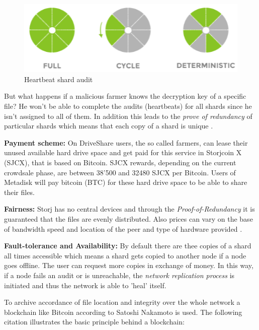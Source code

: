 	\begin{figure}[ht]
		\begin{center}
		\includegraphics[scale=0.8]{Talk5/storj_heartbeat.PNG}
		\end{center}
		\caption{Heartbeat shard audit \cite{storj:PDF}}
		\label{storj_heartbeat}
	\end{figure}

But what happens if a malicious farmer knows the decryption key of a specific file? He won't be able to complete the audits (heartbeats) for all shards since he isn't assigned to all of them. In addition this leads to the \textit{prove of redundancy} of particular shards which means that each copy of a shard is unique \cite{storj:PDF}.

\textbf{Payment scheme:} On DriveShare users, the so called farmers, can lease their unused available hard drive space and get paid for this service in Storjcoin X (SJCX), that is based on Bitcoin. SJCX rewards, depending on the current crowdsale phase, are between 38'500 and 32480 SJCX per Bitcoin\cite{storj:crowdsale}. Users of Metadisk will pay bitcoin (BTC) for these hard drive space to be able to share their files.

\textbf{Fairness:} Storj has no central devices and through the \textit{Proof-of-Redundancy} it is guaranteed that the files are evenly distributed. Also prices can vary on the base of bandwidth speed and location of the peer and type of hardware provided \cite{storj:PDF}.

\textbf{Fault-tolerance and Availability:} By default there are thee copies of a shard all times accessible which means a shard gets copied to another node if a node goes offline. The user can request more copies in exchange of money. In this way, if a node fails an audit or is unreachable, the \textit{network replication process} is initiated and thus the network is able to 'heal' itself.

To archive accordance of file location and integrity over the whole network a blockchain like Bitcoin according to Satoshi Nakamoto \cite{bitcoin} is used. The following citation illustrates the basic principle behind a blockchain:

